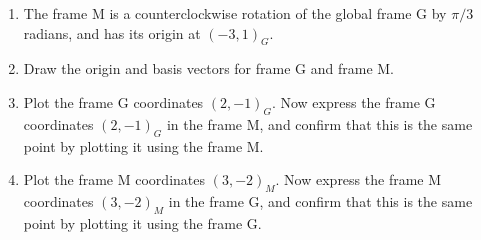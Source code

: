 \documentclass[M3_Night6_Solutions]{subfiles}
\begin{document}
\begin{enumerate}[series=exercises, label=\textbf{Exercise} (\arabic*)]
\begin{enumerate}[resume=exercises, label=\textbf{Exercise} (\arabic*)]
\item The frame M is a counterclockwise rotation of the global frame G by $\pi/3$ radians, and has its origin at $(-3,1)_G$.
\be
\item Draw the origin and basis vectors for frame G and frame M.
\item Plot the frame G coordinates $(2,-1)_G$. Now express the frame G coordinates $(2,-1)_G$ in the frame M, and confirm that this is the same point by plotting it using the frame M.
\item Plot the frame M coordinates $(3,-2)_M$. Now express the frame M coordinates $(3,-2)_M$ in the frame G, and confirm that this is the same point by plotting it using the frame G.
\ee
\ee


\end{enumerate}
\end{enumerate}
\end{document}
